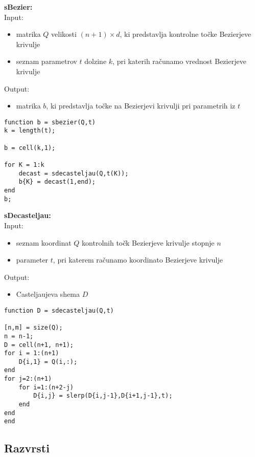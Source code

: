 \documentclass[12pt,a4paper,twoside]{article}
\theoremstyle{definition} %
\theoremstyle{plain} %
\numberwithin{equation}{section}  %
\begin{document}
\newpage

\textbf{sBezier:}\\
Input:
\begin{itemize}
\item matrika $Q$ velikosti $(n+1) \times d$, ki predstavlja kontrolne točke Bezierjeve krivulje
\item seznam parametrov $t$ dolzine $k$, pri katerih računamo vrednost Bezierjeve krivulje
\end{itemize}
Output:
\begin{itemize}
\item matrika $b$, ki predstavlja točke na Bezierjevi krivulji pri parametrih iz $t$
\end{itemize}

\begin{lstlisting}[caption = {sbezier}]
function b = sbezier(Q,t)
k = length(t);

b = cell(k,1);

for K = 1:k
    decast = sdecasteljau(Q,t(K));
    b{K} = decast(1,end);
end
b;
\end{lstlisting}

\vspace{0.5cm}
\textbf{sDecasteljau:}\\
Input:
\begin{itemize}
\item seznam koordinat $Q$ kontrolnih točk Bezierjeve krivulje stopnje $n$
\item parameter $t$, pri katerem računamo koordinato Bezierjeve krivulje
\end{itemize}
Output:
\begin{itemize}
\item Casteljaujeva shema $D$
\end{itemize}

\begin{lstlisting}[caption = {sdecasteljau}]
function D = sdecasteljau(Q,t)

[n,m] = size(Q);
n = n-1;
D = cell(n+1, n+1);
for i = 1:(n+1)
    D{i,1} = Q(i,:);
end
for j=2:(n+1)
    for i=1:(n+2-j)
        D{i,j} = slerp(D{i,j-1},D{i+1,j-1},t);
    end
end
end
\end{lstlisting}

\newpage

\subsection{Razvrsti}
\end{document}
